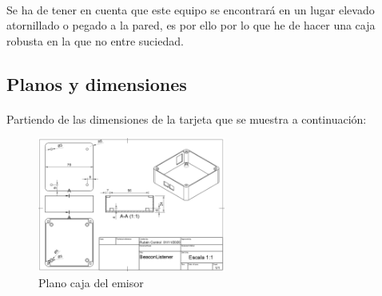 \documentclass[a4paper ,12pt, onecolumn]{article}
\begin{document}
        \paragraph{}
        Se ha de tener en cuenta que este equipo se encontrará en un lugar elevado atornillado o pegado a la pared, 
        es por ello por lo que he de hacer una caja robusta en la que no entre suciedad. 
    \subsection{Planos y dimensiones}
        \paragraph{}
        Partiendo de las dimensiones de la tarjeta que se muestra a continuación:
        \begin{center}
            \begin{figure}[h]
                \centering
                \includegraphics[width=0.55\textwidth]{../model_master.PNG}
                \caption{Plano caja del emisor}
                \label{fig:mesh1}
            \end{figure}
        \end{center}
        \paragraph{}
        \paragraph{}
\end{document}

